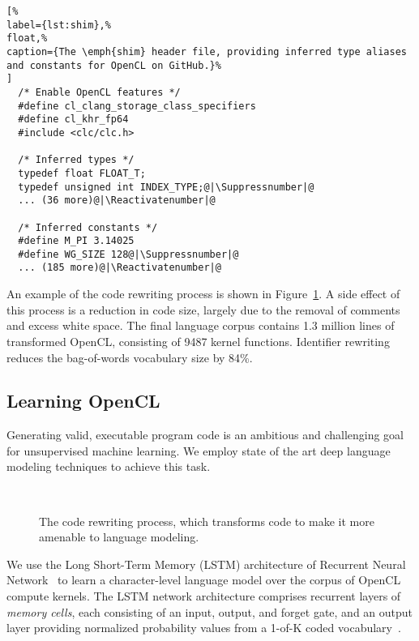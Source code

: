 \lstset{language=C}
\begin{lstlisting}[%
label={lst:shim},%
float,%
caption={The \emph{shim} header file, providing inferred type aliases and constants for OpenCL on GitHub.}%
]
  /* Enable OpenCL features */
  #define cl_clang_storage_class_specifiers
  #define cl_khr_fp64
  #include <clc/clc.h>

  /* Inferred types */
  typedef float FLOAT_T;
  typedef unsigned int INDEX_TYPE;@|\Suppressnumber|@
  ... (36 more)@|\Reactivatenumber|@

  /* Inferred constants */
  #define M_PI 3.14025
  #define WG_SIZE 128@|\Suppressnumber|@
  ... (185 more)@|\Reactivatenumber|@
\end{lstlisting}

\noindent %
An example of the code rewriting process is shown in Figure~\ref{lst:norm}. A side effect of this process is a reduction in code size, largely due to the removal of comments and excess white space. The final language corpus contains 1.3 million lines of transformed OpenCL, consisting of 9487 kernel functions. Identifier rewriting reduces the bag-of-words vocabulary size by 84\%.

\subsection{Learning OpenCL}\label{sec:ml}

Generating valid, executable program code is an ambitious and challenging goal for unsupervised machine learning. We employ state of the art deep language modeling techniques to achieve this task.

\begin{figure}
  \centering%
  \\%
  \caption{The code rewriting process, which transforms code to make it more amenable to language modeling.}%
  \label{lst:norm}
\end{figure}

We use the Long Short-Term Memory (LSTM) architecture of Recurrent Neural Network~\cite{Sundermeyer2012,Mikolov2015} to learn a character-level language model over the corpus of OpenCL compute kernels. The LSTM network architecture comprises recurrent layers of \emph{memory cells}, each consisting of an input, output, and forget gate, and an output layer providing normalized probability values from a 1-of-K coded vocabulary~\cite{Graves}.

